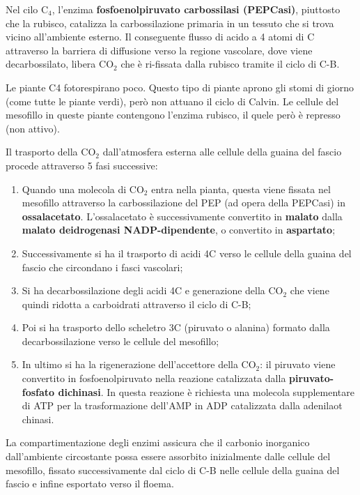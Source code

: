 \documentclass[]{article}
\begin{document}
Nel cilo C$_4$, l'enzima \textbf{fosfoenolpiruvato carbossilasi
(PEPCasi)}, piuttosto che la rubisco, catalizza la carbossilazione
primaria in un tessuto che si trova vicino all'ambiente esterno. Il
conseguente flusso di acido a 4 atomi di C attraverso la barriera di
diffusione verso la regione vascolare, dove viene decarbossilato, libera
CO$_2$ che è ri-fissata dalla rubisco tramite il ciclo di C-B.

Le piante C4 fotorespirano poco. Questo tipo di piante aprono gli stomi
di giorno (come tutte le piante verdi), però non attuano il ciclo di
Calvin. Le cellule del mesofillo in queste piante contengono l'enzima
rubisco, il quele però è represso (non attivo).

Il trasporto della CO$_2$ dall'atmosfera esterna alle cellule della
guaina del fascio procede attraverso 5 fasi successive:

\begin{enumerate}
\def\labelenumi{\arabic{enumi}.}
\item
  Quando una molecola di CO$_2$ entra nella pianta, questa viene fissata
  nel mesofillo attraverso la carbossilazione del PEP (ad opera della
  PEPCasi) in \textbf{ossalacetato}. L'ossalacetato è successivamente
  convertito in \textbf{malato} dalla \textbf{malato deidrogenasi
  NADP-dipendente}, o convertito in \textbf{aspartato};
\item
  Successivamente si ha il trasporto di acidi 4C verso le cellule della
  guaina del fascio che circondano i fasci vascolari;
\item
  Si ha decarbossilazione degli acidi 4C e generazione della CO$_2$ che
  viene quindi ridotta a carboidrati attraverso il ciclo di C-B;
\item
  Poi si ha trasporto dello scheletro 3C (piruvato o alanina) formato
  dalla decarbossilazione verso le cellule del mesofillo;
\item
  In ultimo si ha la rigenerazione dell'accettore della CO$_2$: il
  piruvato viene convertito in fosfoenolpiruvato nella reazione
  catalizzata dalla \textbf{piruvato-fosfato dichinasi}. In questa
  reazione è richiesta una molecola supplementare di ATP per la
  trasformazione dell'AMP in ADP catalizzata dalla adenilaot chinasi.
\end{enumerate}

La compartimentazione degli enzimi assicura che il carbonio inorganico
dall'ambiente circostante possa essere assorbito inizialmente dalle
cellule del mesofillo, fissato successivamente dal ciclo di C-B nelle
cellule della guaina del fascio e infine esportato verso il floema.
\end{document}
